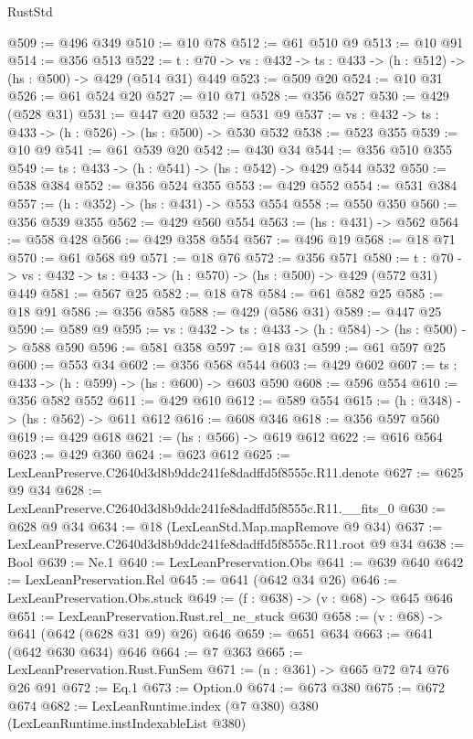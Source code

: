 \begin{lexlean}{RustStd}
\begin{coremodule}
@509 := @496 @349
@510 := @10 @78
@512 := @61 @510 @9
@513 := @10 @91
@514 := @356 @513
@522 := {t : @70} -> {vs : @432} -> {ts : @433} -> (h : @512) -> (hs : @500) -> @429 (@514 @31) @449
@523 := @509 @20
@524 := @10 @31
@526 := @61 @524 @20
@527 := @10 @71
@528 := @356 @527
@530 := @429 (@528 @31)
@531 := @447 @20
@532 := @531 @9
@537 := {vs : @432} -> {ts : @433} -> (h : @526) -> (hs : @500) -> @530 @532
@538 := @523 @355
@539 := @10 @9
@541 := @61 @539 @20
@542 := @430 @34
@544 := @356 @510 @355
@549 := {ts : @433} -> (h : @541) -> (hs : @542) -> @429 @544 @532
@550 := @538 @384
@552 := @356 @524 @355
@553 := @429 @552
@554 := @531 @384
@557 := (h : @352) -> (hs : @431) -> @553 @554
@558 := @550 @350
@560 := @356 @539 @355
@562 := @429 @560 @554
@563 := (hs : @431) -> @562
@564 := @558 @428
@566 := @429 @358 @554
@567 := @496 @19
@568 := @18 @71
@570 := @61 @568 @9
@571 := @18 @76
@572 := @356 @571
@580 := {t : @70} -> {vs : @432} -> {ts : @433} -> (h : @570) -> (hs : @500) -> @429 (@572 @31) @449
@581 := @567 @25
@582 := @18 @78
@584 := @61 @582 @25
@585 := @18 @91
@586 := @356 @585
@588 := @429 (@586 @31)
@589 := @447 @25
@590 := @589 @9
@595 := {vs : @432} -> {ts : @433} -> (h : @584) -> (hs : @500) -> @588 @590
@596 := @581 @358
@597 := @18 @31
@599 := @61 @597 @25
@600 := @553 @34
@602 := @356 @568 @544
@603 := @429 @602
@607 := {ts : @433} -> (h : @599) -> (hs : @600) -> @603 @590
@608 := @596 @554
@610 := @356 @582 @552
@611 := @429 @610
@612 := @589 @554
@615 := (h : @348) -> (hs : @562) -> @611 @612
@616 := @608 @346
@618 := @356 @597 @560
@619 := @429 @618
@621 := (hs : @566) -> @619 @612
@622 := @616 @564
@623 := @429 @360
@624 := @623 @612
@625 := LexLeanPreserve.C2640d3d8b9ddc241fe8dadffd5f8555c.R11.denote
@627 := @625 @9 @34
@628 := LexLeanPreserve.C2640d3d8b9ddc241fe8dadffd5f8555c.R11.__fits_0
@630 := @628 @9 @34
@634 := @18 (LexLeanStd.Map.mapRemove @9 @34)
@637 := LexLeanPreserve.C2640d3d8b9ddc241fe8dadffd5f8555c.R11.root @9 @34
@638 := Bool
@639 := Ne.{1}
@640 := LexLeanPreservation.Obs
@641 := @639 @640
@642 := LexLeanPreservation.Rel
@645 := @641 (@642 @34 @26)
@646 := LexLeanPreservation.Obs.stuck
@649 := (f : @638) -> (v : @68) -> @645 @646
@651 := LexLeanPreservation.Rust.rel_ne_stuck @630
@658 := (v : @68) -> @641 (@642 (@628 @31 @9) @26) @646
@659 := @651 @634
@663 := @641 (@642 @630 @634) @646
@664 := @7 @363
@665 := LexLeanPreservation.Rust.FunSem
@671 := (n : @361) -> @665 @72 @74 @76 @26 @91
@672 := Eq.{1}
@673 := Option.{0}
@674 := @673 @380
@675 := @672 @674
@682 := LexLeanRuntime.index (@7 @380) @380 (LexLeanRuntime.instIndexableList @380)

\end{coremodule}
\end{lexlean}

